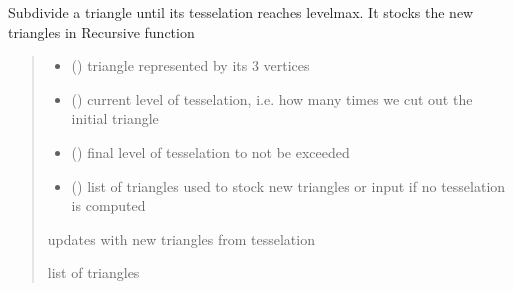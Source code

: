 \documentclass[letterpaper,10pt,english]{sphinxmanual}
\begin{document}

\begin{fulllineitems}
\label{\detokenize{reference:tesselator.iterate_triangles}}
\pysigstartsignatures
{}
\pysigstopsignatures
\sphinxAtStartPar
Subdivide a triangle until its tesselation reaches levelmax. It stocks the new triangles in 
Recursive function
\begin{quote}\begin{description}
\begin{itemize}
\item {} 
\sphinxAtStartPar
{} () \textendash{} triangle represented by its 3 vertices 

\item {} 
\sphinxAtStartPar
{} () \textendash{} current level of tesselation, i.e. how many times we cut out the initial triangle

\item {} 
\sphinxAtStartPar
{} () \textendash{} final level of tesselation to not be exceeded

\item {} 
\sphinxAtStartPar
{} () \textendash{} list of triangles used to stock new triangles or input  if no tesselation is computed

\end{itemize}

\sphinxAtStartPar
{} updates with new triangles from tesselation

\sphinxAtStartPar
list of triangles

\end{description}\end{quote}

\end{fulllineitems}
\end{document}
